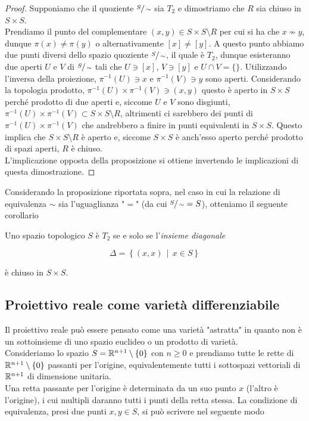 \begin{proof}\label{solved-es2-3}
	Supponiamo che il quoziente $ \sfrac{S}{\sim} $ sia $ T_{2} $ e dimostriamo che $ R $ sia chiuso in $ S\times S $.\\
	Prendiamo il punto del complementare $ (x,y) \in S \times S \setminus R $ per cui si ha che $ x \nsim y $, dunque $ \pi(x) \neq \pi(y) $ o alternativamente $ [x] \neq [y] $. A questo punto abbiamo due punti diversi dello spazio quoziente $ \sfrac{S}{\sim} $, il quale è $ T_{2} $, dunque esisteranno due aperti $ U $ e $ V $ di $ \sfrac{S}{\sim} $ tali che $ U \ni [x] $, $ V \ni [y] $ e $ U \cap V = \{\} $. Utilizzando l'inversa della proiezione, $ \pi^{-1}(U) \ni x $ e $ \pi^{-1}(V) \ni y $ sono aperti. Considerando la topologia prodotto, $ \pi^{-1}(U) \times \pi^{-1}(V) \ni (x,y) $ questo è aperto in $ S \times S $ perché prodotto di due aperti e, siccome $ U $ e $ V $ sono disgiunti, $ \pi^{-1}(U) \times \pi^{-1}(V) \subset S \times S \setminus R $, altrimenti ci sarebbero dei punti di $ \pi^{-1}(U) \times \pi^{-1}(V) $ che andrebbero a finire in punti equivalenti in $ S \times S $. Questo implica che $ S \times S \setminus R $ è aperto e, siccome $ S \times S $ è anch'esso aperto perché prodotto di spazi aperti, $ R $ è chiuso.\\
	L'implicazione opposta della proposizione si ottiene invertendo le implicazioni di questa dimostrazione.
\end{proof}

Considerando la proposizione riportata sopra, nel caso in cui la relazione di equivalenza $ \sim $ sia l'uguaglianza "$ = $" (da cui $ \sfrac{S}{\sim} = S $), otteniamo il seguente corollario

\begin{corollary}
	Uno spazio topologico $ S $ è $ T_{2} $ se e solo se l'\textit{insieme diagonale}
	
	\begin{equation}
		\Delta = \left\{ (x,x) \, \middle| \, x \in S \right\}
	\end{equation}
	
	è chiuso in $ S \times S $.
\end{corollary}

\subsection{Proiettivo reale come varietà differenziabile}

Il proiettivo reale può essere pensato come una varietà "astratta" in quanto non è un sottoinsieme di uno spazio euclideo o un prodotto di varietà.\\
Consideriamo lo spazio $ S = \mathbb{R}^{n+1} \setminus \{0\} $ con $ n \geqslant 0 $ e prendiamo tutte le rette di $ \mathbb{R}^{n+1} \setminus \{0\} $ passanti per l'origine, equivalentemente tutti i sottospazi vettoriali di $ \mathbb{R}^{n+1} $ di dimensione unitaria.\\
Una retta passante per l'origine è determinata da un suo punto $ x $ (l'altro è l'origine), i cui multipli daranno tutti i punti della retta stessa. La condizione di equivalenza, presi due punti $ x,y \in S $, si può scrivere nel seguente modo

